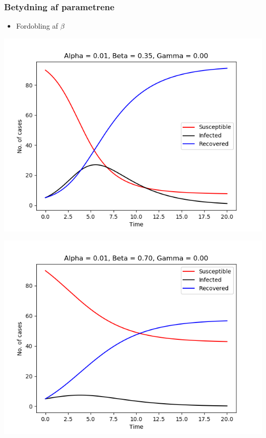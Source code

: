 %
\begin{frame}
\frametitle{Betydning af parametrene}
\begin{itemize}
\item Fordobling af $\beta$
\end{itemize}

\begin{minipage}{0.49\textwidth}
\includegraphics[scale=0.3]{fig/img/t_a1_b35_g0.png}
\end{minipage}
%
\begin{minipage}{0.49\textwidth}
\includegraphics[scale=0.3]{fig/img/t_a1_b7_g0.png}
\end{minipage}
\end{frame}
%
